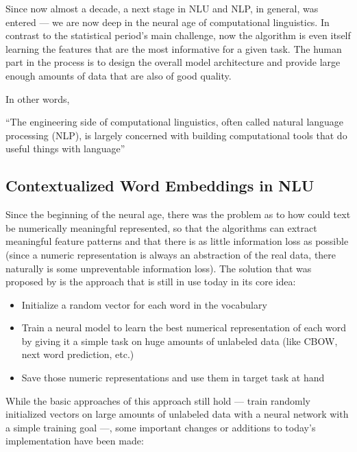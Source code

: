Since now almost a decade, a next stage in NLU and NLP, in general, was entered --- we are
now deep in the neural age of computational linguistics.  In contrast to the statistical
period's main challenge, now the algorithm is even itself learning the features that are the
most informative for a given task.  The human part in the process is to design the overall
model architecture and provide large enough amounts of data that are also of good quality.

In other words,

``The engineering side of computational linguistics, often called natural language processing
(NLP), is largely concerned with building computational tools that do useful things with
language'' \cite{johnson2009statistical}

\subsection{Contextualized Word Embeddings in NLU}

Since the beginning of the neural age, there was the problem as to how could text be numerically
meaningful represented, so that the algorithms can extract meaningful feature patterns and
that there is as little information loss as possible (since a numeric representation is always
an abstraction of the real data, there naturally is some unpreventable information loss).
The solution that was proposed by \cite{mikolov2013distributed} is the approach that is still
in use today in its core idea:

\begin{itemize}
	\item Initialize a random vector for each word in the vocabulary
	\item Train a neural model to learn the best numerical representation of each word
		by giving it a simple task on huge amounts of unlabeled data (like CBOW, next word
		prediction, etc.)
	\item Save those numeric representations and use them in target task at hand
\end{itemize}

While the basic approaches of this approach still hold --- train randomly initialized vectors on
large amounts of unlabeled data with a neural network with a simple training goal ---, some important
changes or additions to today's implementation have been made:

